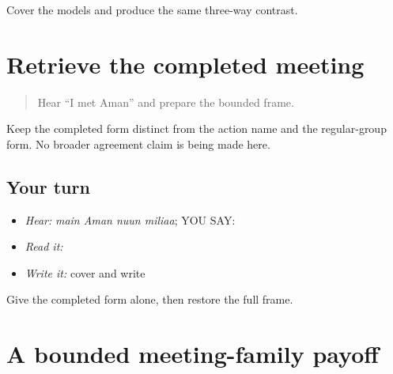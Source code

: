 \begin{tcolorbox}[breakable,colback=teal!4,colframe=teal!35!black,title={Before you move on}]
Cover the models and produce the same three-way contrast.
\end{tcolorbox}
\section[\texorpdfstring{\pa{ਮੈਂ} \pa{ਅਮਨ} \pa{ਨੂੰ} \pa{ਮਿਲਿਆ} (main Aman nuun miliaa)}{ਮੈਂ ਅਮਨ ਨੂੰ ਮਿਲਿਆ (main Aman nuun miliaa)}]{Retrieve the completed meeting}

\label{lesson:PA-C188-milia-review}



\begin{quote}
Hear “I met Aman” and prepare the bounded frame.
\end{quote}

\begin{grammarlens}[title={Grammar Lens}]
Keep the completed form distinct from the action name and the regular-group form. No broader agreement claim is being made here.
\end{grammarlens}

\subsection*{Your turn}
\begin{itemize}
\raggedright
  \item \emph{Hear:} \emph{main Aman nuun miliaa}; YOU SAY: \textbf{   }
  \item \emph{Read it:} \textbf{   }
  \item \emph{Write it:} cover and write \textbf{   }
\end{itemize}

\begin{tcolorbox}[breakable,colback=teal!4,colframe=teal!35!black,title={Before you move on}]
Give the completed form alone, then restore the full frame.
\end{tcolorbox}
\section[\texorpdfstring{\pa{ਮਿਲਣਾ} · \pa{ਅਸੀਂ} \pa{ਮਿਲਦੇ} … (milnaa; asiin …)}{ਮਿਲਣਾ · ਅਸੀਂ ਮਿਲਦੇ … (milnaa; asiin …)}]{A bounded meeting-family payoff}

\label{lesson:PA-C188-payoff}



